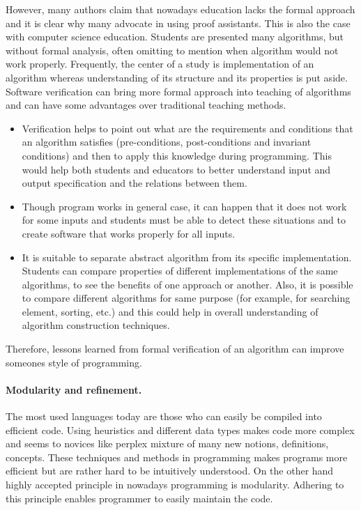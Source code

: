 \documentclass[11pt,a4paper]{article}
\begin{document}
However, many authors claim that nowadays education lacks the formal
approach and it is clear why many advocate in using proof
assistants\cite{LSDtrip}. This is also the case with computer science
education. Students are presented many algorithms, but without formal
analysis, often omitting to mention when algorithm would not work
properly. Frequently, the center of a study is implementation of an
algorithm whereas understanding of its structure and its properties is
put aside. Software verification can bring more formal approach into
teaching of algorithms and can have some advantages over traditional
teaching methods.
\begin{itemize}
\item Verification helps to point out what are the requirements and
  conditions that an algorithm satisfies (pre-conditions,
  post-conditions and invariant conditions) and then to apply this
  knowledge during programming. This would help both students and
  educators to better understand input and output specification and
  the relations between them.
\item Though program works in general case, it can happen that it does
  not work for some inputs and students must be able to detect these
  situations and to create software that works properly for all
  inputs.
\item It is suitable to separate abstract algorithm from its specific
  implementation. Students can compare properties of different
  implementations of the same algorithms, to see the benefits of one
  approach or another. Also, it is possible to compare different
  algorithms for same purpose (for example, for searching element,
  sorting, etc.) and this could help in overall understanding of
  algorithm construction techniques.
\end{itemize}
Therefore, lessons learned from formal verification of an algorithm
can improve someones style of programming.

\paragraph*{Modularity and refinement.}
The most used languages today are those who can easily be compiled
into efficient code. Using heuristics and different data types makes
code more complex and seems to novices like perplex mixture of many
new notions, definitions, concepts. These techniques and methods in
programming makes programs more efficient but are rather hard to be
intuitively understood. On the other hand highly accepted principle in
nowadays programming is modularity. Adhering to this principle enables
programmer to easily maintain the code.
\end{document}
